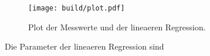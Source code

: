 



  \begin{figure}
    \centering
    \texttt{[image: build/plot.pdf]}
    \caption{Plot der Messwerte und der lineaeren Regression.}
    \label{fig:plot1}
  \end{figure}

  Die Parameter der lineaeren Regression sind
  \begin{align}
    
  \end{align}

